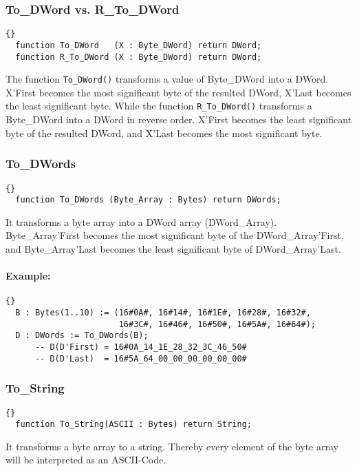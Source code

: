 \hhline
\subsubsection*{To\_DWord vs. R\_To\_DWord}
\begin{lstlisting}{}
  function To_DWord   (X : Byte_DWord) return DWord;
  function R_To_DWord (X : Byte_DWord) return DWord;
\end{lstlisting}
The function \texttt{To\_DWord()} transforms a value of Byte\_DWord
into a DWord.  X'First becomes the most significant byte of the
resulted DWord, X'Last becomes the least significant byte.  While the
function \texttt{R\_To\_DWord()} transforms a Byte\_DWord into a DWord
in reverse order. X'First becomes the least significant byte of the
resulted DWord, and X'Last becomes the most significant byte.

\hhline
\subsubsection*{To\_DWords}
\begin{lstlisting}{}
  function To_DWords (Byte_Array : Bytes) return DWords;
\end{lstlisting}
It transforms a byte array into a DWord array
(DWord\_Array). Byte\_Array'First becomes the most significant byte of
the DWord\_Array'First, and Byte\_Array'Last becomes the least
significant byte of DWord\_Array'Last.

\paragraph{Example:}
\begin{lstlisting}{}
  B : Bytes(1..10) := (16#0A#, 16#14#, 16#1E#, 16#28#, 16#32#,
                       16#3C#, 16#46#, 16#50#, 16#5A#, 16#64#);
  D : DWords := To_DWords(B);
      -- D(D'First) = 16#0A_14_1E_28_32_3C_46_50#
      -- D(D'Last)  = 16#5A_64_00_00_00_00_00_00#
\end{lstlisting}
\hhline
\subsubsection*{To\_String}
\begin{lstlisting}{}
  function To_String(ASCII : Bytes) return String;
\end{lstlisting}
It transforms a byte array to a string. Thereby every element of the
byte array will be interpreted as an ASCII-Code.

